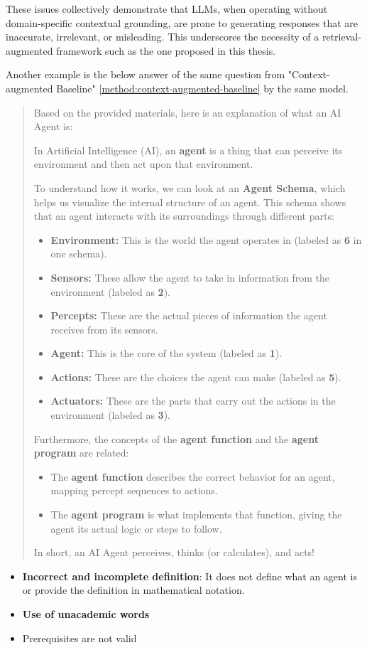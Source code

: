 These issues collectively demonstrate that LLMs, when operating without domain-specific contextual grounding, are prone to generating responses that are inaccurate, irrelevant, or misleading. This underscores the necessity of a retrieval-augmented framework such as the one proposed in this thesis.

Another example is the below answer of the same question from "Context-augmented Baseline" \ref{method:context-augmented-baseline} by the same model.
\begin{quote}
Based on the provided materials, here is an explanation of what an AI Agent is:

In Artificial Intelligence (AI), an \textbf{agent} is a thing that can perceive its environment and then act upon that environment.

To understand how it works, we can look at an \textbf{Agent Schema}, which helps us visualize the internal structure of an agent. This schema shows that an agent interacts with its surroundings through different parts:

\begin{itemize}
    \item \textbf{Environment:} This is the world the agent operates in (labeled as \textbf{6} in one schema).
    \item \textbf{Sensors:} These allow the agent to take in information from the environment (labeled as \textbf{2}).
    \item \textbf{Percepts:} These are the actual pieces of information the agent receives from its sensors.
    \item \textbf{Agent:} This is the core of the system (labeled as \textbf{1}).
    \item \textbf{Actions:} These are the choices the agent can make (labeled as \textbf{5}).
    \item \textbf{Actuators:} These are the parts that carry out the actions in the environment (labeled as \textbf{3}).
\end{itemize}

Furthermore, the concepts of the \textbf{agent function} and the \textbf{agent program} are related:

\begin{itemize}
    \item The \textbf{agent function} describes the correct behavior for an agent, mapping percept sequences to actions.
    \item The \textbf{agent program} is what implements that function, giving the agent its actual logic or steps to follow.
\end{itemize}

In short, an AI Agent perceives, thinks (or calculates), and acts!

\end{quote}

\begin{itemize}
    \item \textbf{Incorrect and incomplete definition}: It does not define what an agent is or provide the definition in mathematical notation. 
    \item \textbf{Use of unacademic words}
    \item Prerequisites are not valid
\end{itemize}